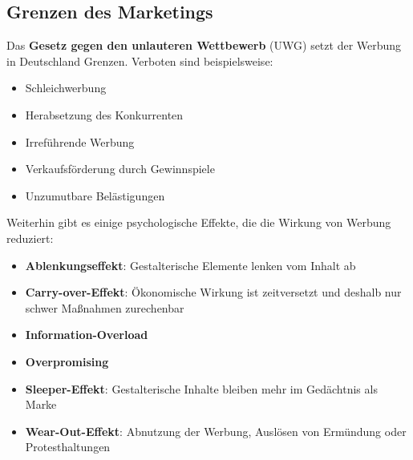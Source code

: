 \documentclass[titlepage,parskip=half]{scrartcl}
\begin{document}
\subsection{Grenzen des Marketings}
Das \textbf{Gesetz gegen den unlauteren Wettbewerb} (UWG) setzt der Werbung in Deutschland Grenzen. Verboten sind beispielsweise:
\begin{itemize}
    \item Schleichwerbung
    \item Herabsetzung des Konkurrenten
    \item Irreführende Werbung
    \item Verkaufsförderung durch Gewinnspiele
    \item Unzumutbare Belästigungen
\end{itemize}

Weiterhin gibt es einige psychologische Effekte, die die Wirkung von Werbung reduziert:
\begin{itemize}
    \item \textbf{Ablenkungseffekt}: Gestalterische Elemente lenken vom Inhalt ab
    \item \textbf{Carry-over-Effekt}: Ökonomische Wirkung ist zeitversetzt und deshalb nur schwer Maßnahmen zurechenbar
    \item \textbf{Information-Overload}
    \item \textbf{Overpromising}
    \item \textbf{Sleeper-Effekt}: Gestalterische Inhalte bleiben mehr im Gedächtnis als Marke
    \item \textbf{Wear-Out-Effekt}: Abnutzung der Werbung, Auslösen von Ermündung oder Protesthaltungen
\end{itemize}
\end{document}
